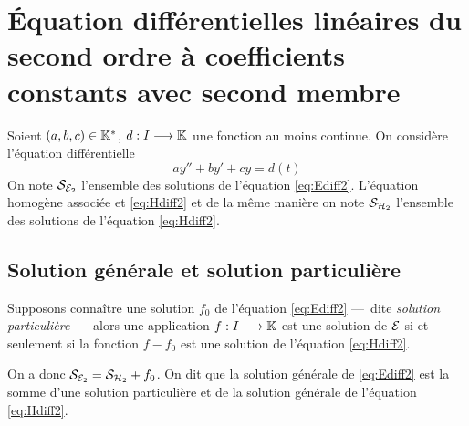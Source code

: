 \section{Équation différentielles linéaires du second ordre à coefficients
constants avec second membre}
\label{sec:eqdifflinsecondordrecoefconstantsecondmembre}

Soient \((a,b,c) \in \mathbb{K}^{*}\), \(d:I \longrightarrow{} \mathbb{K}\) une fonction au moins
continue. On considère l'équation différentielle
\begin{equation}
  \label{eq:Ediff2}
  ay'' + by' + cy = d(t) \tag{\(\E_2\)}
\end{equation}
On note \(\mathcal{S}_{\mathcal{E}_2}\) l'ensemble des solutions de l'équation \eqref{eq:Ediff2}.
L'équation homogène associée et \eqref{eq:Hdiff2} et de la même manière on note
\(\mathcal{S}_{\mathcal{H}_2}\) l'ensemble des solutions de l'équation \eqref{eq:Hdiff2}.

\subsection{Solution générale et solution particulière}
\label{subsec:solutiongeneraleetsolutionpart}

\begin{theo}
  Supposons connaître une solution \(f_0\) de l'équation \eqref{eq:Ediff2}
  ---~dite \emph{solution particulière}~--- alors une application
  \(f:I \longrightarrow{} \mathbb{K}\) est une solution de \(\mathcal{E}\) si et seulement si la
  fonction \(f-f_0\) est une solution de l'équation \eqref{eq:Hdiff2}.

  On a donc \(\mathcal{S}_{\mathcal{E}_2} = \mathcal{S}_{\mathcal{H}_2} + f_0\). On dit que la solution générale
  de \eqref{eq:Ediff2} est la somme d'une solution particulière et de la
  solution générale de l'équation \eqref{eq:Hdiff2}.
\end{theo}

